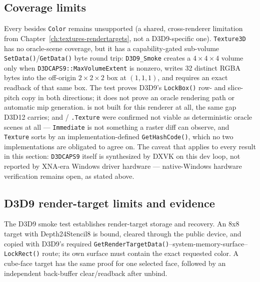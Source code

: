 \subsection{Coverage limits}

Every  besides \texttt{Color} remains unsupported (a shared,
cross-renderer limitation from Chapter~\ref{ch:textures-rendertargets}, not a D3D9-specific
one). \texttt{Texture3D} has no oracle-scene coverage, but it has a capability-gated
sub-volume \texttt{SetData()}/\texttt{GetData()} byte round trip: \texttt{D3D9\_Smoke} creates a
\(4\times4\times4\) volume only when \texttt{D3DCAPS9::MaxVolumeExtent}
is nonzero, writes 32 distinct RGBA bytes into the off-origin \(2\times2\times2\) box at
\((1,1,1)\), and requires an exact readback of that same box. The test proves D3D9's
\texttt{LockBox()} row- and slice-pitch copy in both directions; it does not prove an oracle
rendering path or automatic mip generation.  is not
built for this renderer at all, the same gap D3D12 carries; and
 / \texttt{.Texture} were confirmed not viable as
deterministic oracle scenes at all --- \texttt{Immediate} is not something a raster diff can
observe, and \texttt{Texture} sorts by an implementation-defined \texttt{GetHashCode()},
which no two implementations are obligated to agree on. The caveat that applies to every
result in this section: \texttt{D3DCAPS9} itself is synthesized by DXVK on this dev loop, not
reported by XNA-era Windows driver hardware --- native-Windows hardware verification remains
open, as stated above.

\subsection{D3D9 render-target limits and evidence}

The D3D9 smoke test establishes render-target storage and recovery. An 8x8 target with
Depth24Stencil8 is bound, cleared
through the public device, and copied with D3D9's required
\texttt{GetRenderTargetData()}--system-memory-surface--\texttt{LockRect()} route; its own surface
must contain the exact requested color. A cube-face target has the same proof for one selected
face, followed by an independent back-buffer clear/readback after unbind.

